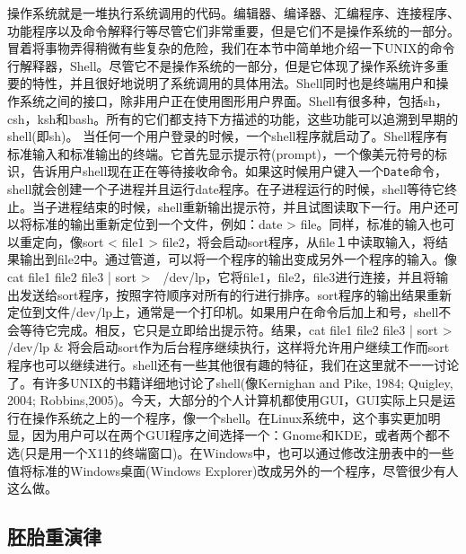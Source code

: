 	操作系统就是一堆执行系统调用的代码。编辑器、编译器、汇编程序、连接程序、功能程序以及命令解释行等尽管它们非常重要，但是它们不是操作系统的一部分。冒着将事物弄得稍微有些复杂的危险，我们在本节中简单地介绍一下UNIX的命令行解释器，Shell。尽管它不是操作系统的一部分，但是它体现了操作系统许多重要的特性，并且很好地说明了系统调用的具体用法。Shell同时也是终端用户和操作系统之间的接口，除非用户正在使用图形用户界面。Shell有很多种，包括sh，csh，ksh和bash。所有的它们都支持下方描述的功能，这些功能可以追溯到早期的shell(即sh)。
	当任何一个用户登录的时候，一个shell程序就启动了。Shell程序有标准输入和标准输出的终端。它首先显示提示符(prompt)，一个像美元符号的标识，告诉用户shell现在正在等待接收命令。如果这时候用户键入一个\texttt{Date}命令，shell就会创建一个子进程并且运行date程序。在子进程运行的时候，shell等待它终止。当子进程结束的时候，shell重新输出提示符，并且试图读取下一行。用户还可以将标准的输出重新定位到一个文件，例如：date > file。同样，标准的输入也可以重定向，像sort < file1 > file2，将会启动sort程序，从file１中读取输入，将结果输出到file2中。通过管道，可以将一个程序的输出变成另外一个程序的输入。像cat file1 file2 file3 | sort >　/dev/lp，它将file1，file2，file3进行连接，并且将输出发送给sort程序，按照字符顺序对所有的行进行排序。sort程序的输出结果重新定位到文件/dev/lp上，通常是一个打印机。如果用户在命令后加上和号，shell不会等待它完成。相反，它只是立即给出提示符。结果，cat file1 file2 file3 | sort > /dev/lp \& 将会启动sort作为后台程序继续执行，这样将允许用户继续工作而sort程序也可以继续进行。shell还有一些其他很有趣的特征，我们在这里就不一一讨论了。有许多UNIX的书籍详细地讨论了shell(像Kernighan and Pike, 1984; Quigley, 2004; Robbins,2005)。今天，大部分的个人计算机都使用GUI，GUI实际上只是运行在操作系统之上的一个程序，像一个shell。在Linux系统中，这个事实更加明显，因为用户可以在两个GUI程序之间选择一个：Gnome和KDE，或者两个都不选(只是用一个X11的终端窗口)。在Windows中，也可以通过修改注册表中的一些值将标准的Windows桌面(Windows Explorer)改成另外的一个程序，尽管很少有人这么做。
	
	\subsection{胚胎重演律}
	
